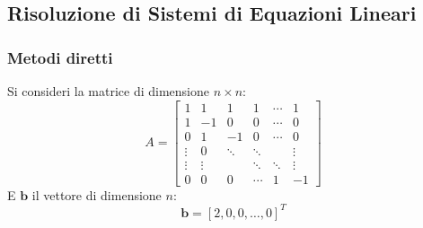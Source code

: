 \subsection{Risoluzione di Sistemi di Equazioni Lineari}

\subsubsection{Metodi diretti}

Si consideri la matrice di dimensione $n \times n$:
\begin{equation*}
    A = \begin{bmatrix}
        1 & 1 & 1 & 1 & \cdots & 1 \\
        1 & -1 & 0 & 0 & \cdots & 0 \\
        0 & 1 & -1 & 0 & \cdots & 0 \\
        \vdots & 0 & \ddots & \ddots & & \vdots \\
        \vdots & \vdots & & \ddots & \ddots & \vdots \\
        0 & 0 & 0 & \cdots & 1 & -1
    \end{bmatrix}
\end{equation*}
E $\mathbf{b}$ il vettore di dimensione $n$:
\begin{equation*}
    \mathbf{b} = \left[ 2, 0, 0, \dots, 0 \right]^{T}
\end{equation*}
